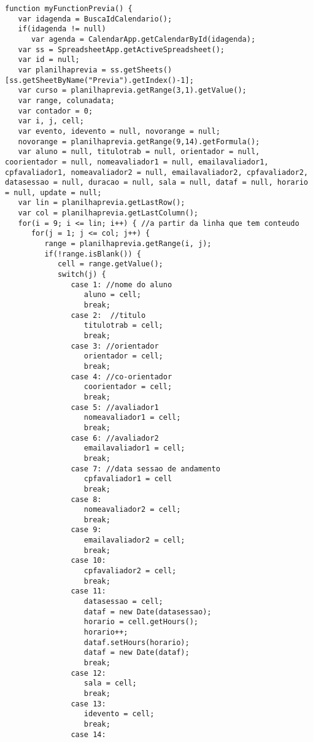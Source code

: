 \begin{lstlisting}
function myFunctionPrevia() {
   var idagenda = BuscaIdCalendario();
   if(idagenda != null)
      var agenda = CalendarApp.getCalendarById(idagenda);
   var ss = SpreadsheetApp.getActiveSpreadsheet();
   var id = null;
   var planilhaprevia = ss.getSheets()[ss.getSheetByName("Previa").getIndex()-1];
   var curso = planilhaprevia.getRange(3,1).getValue();
   var range, colunadata; 
   var contador = 0;
   var i, j, cell;
   var evento, idevento = null, novorange = null;
   novorange = planilhaprevia.getRange(9,14).getFormula();
   var aluno = null, titulotrab = null, orientador = null, coorientador = null, nomeavaliador1 = null, emailavaliador1, cpfavaliador1, nomeavaliador2 = null, emailavaliador2, cpfavaliador2, datasessao = null, duracao = null, sala = null, dataf = null, horario = null, update = null;
   var lin = planilhaprevia.getLastRow();
   var col = planilhaprevia.getLastColumn();
   for(i = 9; i <= lin; i++) { //a partir da linha que tem conteudo
      for(j = 1; j <= col; j++) {
         range = planilhaprevia.getRange(i, j);
         if(!range.isBlank()) {
            cell = range.getValue();
            switch(j) {
               case 1: //nome do aluno
                  aluno = cell;
                  break;
               case 2:  //titulo
                  titulotrab = cell;
                  break;
               case 3: //orientador
                  orientador = cell;
                  break;
               case 4: //co-orientador
                  coorientador = cell; 
                  break;
               case 5: //avaliador1
                  nomeavaliador1 = cell;
                  break;
               case 6: //avaliador2
                  emailavaliador1 = cell;
                  break;
               case 7: //data sessao de andamento
                  cpfavaliador1 = cell
                  break;
               case 8:
                  nomeavaliador2 = cell;
                  break;
               case 9:
                  emailavaliador2 = cell;
                  break;     
               case 10:
                  cpfavaliador2 = cell;
                  break;  
               case 11:
                  datasessao = cell;
                  dataf = new Date(datasessao);
                  horario = cell.getHours();
                  horario++;
                  dataf.setHours(horario);
                  dataf = new Date(dataf);
                  break;
               case 12:
                  sala = cell;
                  break;  
               case 13:
                  idevento = cell;
                  break; 
               case 14:

\end{lstlisting}

